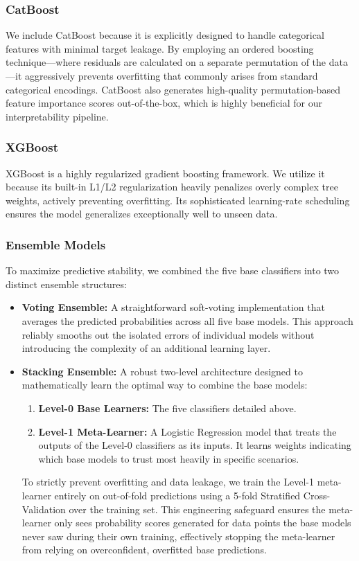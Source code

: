 \documentclass[11pt]{article}
\begin{document}
\subsubsection{CatBoost}

We include CatBoost because it is explicitly designed to handle categorical features with minimal target leakage. By employing an ordered boosting technique---where residuals are calculated on a separate permutation of the data---it aggressively prevents overfitting that commonly arises from standard categorical encodings. CatBoost also generates high-quality permutation-based feature importance scores out-of-the-box, which is highly beneficial for our interpretability pipeline.

\subsubsection{XGBoost}

XGBoost is a highly regularized gradient boosting framework. We utilize it because its built-in L1/L2 regularization heavily penalizes overly complex tree weights, actively preventing overfitting. Its sophisticated learning-rate scheduling ensures the model generalizes exceptionally well to unseen data.

\subsubsection{Ensemble Models}

To maximize predictive stability, we combined the five base classifiers into two distinct ensemble structures:

\begin{itemize}
    \item \textbf{Voting Ensemble:} A straightforward soft-voting implementation that averages the predicted probabilities across all five base models. This approach reliably smooths out the isolated errors of individual models without introducing the complexity of an additional learning layer.
    \item \textbf{Stacking Ensemble:} A robust two-level architecture designed to mathematically learn the optimal way to combine the base models:
    \begin{enumerate}
        \item \textbf{Level-0 Base Learners:} The five classifiers detailed above.
        \item \textbf{Level-1 Meta-Learner:} A Logistic Regression model that treats the outputs of the Level-0 classifiers as its inputs. It learns weights indicating which base models to trust most heavily in specific scenarios.
    \end{enumerate}
    To strictly prevent overfitting and data leakage, we train the Level-1 meta-learner entirely on out-of-fold predictions using a 5-fold Stratified Cross-Validation over the training set. This engineering safeguard ensures the meta-learner only sees probability scores generated for data points the base models never saw during their own training, effectively stopping the meta-learner from relying on overconfident, overfitted base predictions.
\end{itemize}
\end{document}
